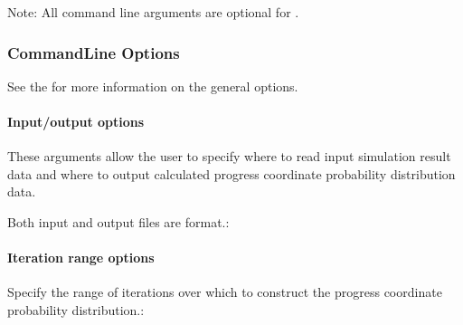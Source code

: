 \documentclass[letterpaper,10pt,english]{sphinxmanual}
\begin{document}
Note: All command line arguments are optional for .


\subsubsection{Command\sphinxhyphen{}Line Options}
\label{\detokenize{users_guide/command_line_tools/w_fluxanl:command-line-options}}
See the  for more
information on the general options.


\paragraph{Input/output options}
\label{\detokenize{users_guide/command_line_tools/w_fluxanl:input-output-options}}
These arguments allow the user to specify where to read input simulation result
data and where to output calculated progress coordinate probability
distribution data.

Both input and output files are  format.:

\begin{sphinxVerbatim}[commandchars=\\\{\}]
  
          
        

  
    
\end{sphinxVerbatim}


\paragraph{Iteration range options}
\label{\detokenize{users_guide/command_line_tools/w_fluxanl:iteration-range-options}}
Specify the range of iterations over which to construct the progress
coordinate probability distribution.:
\end{document}
